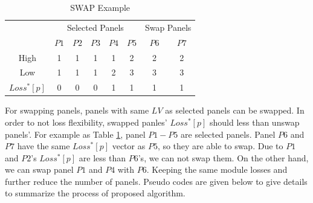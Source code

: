 \documentclass[conference]{IEEEtran}
\begin{document}
\begin{table}[htbp]
\caption{SWAP Example}
\begin{center}
\begin{tabular}{c|ccccc|cc}\hline \hline
                               & \multicolumn{5}{c|}{Selected Panels} & \multicolumn{2}{c}{Swap Panels} \\
                               & $P1$    & $P2$   & $P3$    & $P4$    & $P5$   & $P6$            & $P7$             \\ \hline
High                           & 1     & 1     & 1     & 1     & 2    & 2              & 2              \\ \hline
Low                            & 1     & 1     & 1     & 2     & 3    & 3              & 3              \\ \hline
$Loss^*[p]$ & 0     & 0     & 0     & 1     & 1    & 1              & 1             
\end{tabular}
\end{center}
\label{table_swap}
\end{table}

For swapping panels, panels with same $LV$ as selected panels can be swapped. In order to not loss flexibility, swapped panles' $Loss^*[p]$ should less than unswap panels'. For example as Table \ref{table_swap}, panel $P1-P5$ are selected panels. Panel $P6$ and $P7$ have the same $Loss^*[p]$ vector as $P5$, so they are able to swap. Due to $P1$ and $P2$'s $Loss^*[p]$ are less than $P6$'s, we can not swap them. On the other hand, we can swap panel $P1$ and $P4$ with $P6$. Keeping the same module losses and further reduce the number of panels.  Pseudo codes are given below to give details to summarize the process of proposed algorithm.
\end{document}
